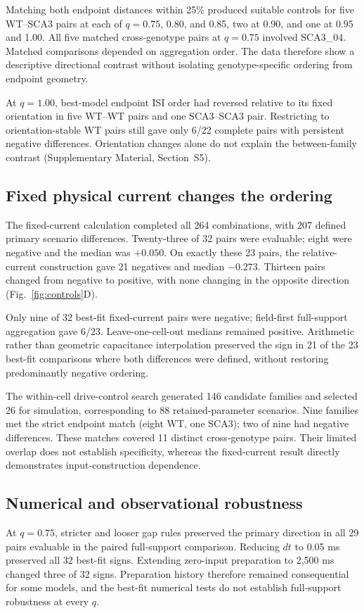 \documentclass[utf8]{FrontiersinHarvard}
\newcommand{\sref}[1]{Supplementary Material, Section~#1}
\begin{document}
Matching both endpoint distances within 25\% produced suitable controls for five WT--SCA3 pairs at each of $q=0.75$, 0.80, and 0.85, two at 0.90, and one at 0.95 and 1.00. All five matched cross-genotype pairs at $q=0.75$ involved SCA3\_04. Matched comparisons depended on aggregation order. The data therefore show a descriptive directional contrast without isolating genotype-specific ordering from endpoint geometry.

At $q=1.00$, best-model endpoint ISI order had reversed relative to its fixed orientation in five WT--WT pairs and one SCA3--SCA3 pair. Restricting to orientation-stable WT pairs still gave only 6/22 complete pairs with persistent negative differences. Orientation changes alone do not explain the between-family contrast (\sref{S5}).



\subsection{Fixed physical current changes the ordering}\label{sec:fixedresults}
The fixed-current calculation completed all 264 combinations, with 207 defined primary scenario differences. Twenty-three of 32 pairs were evaluable; eight were negative and the median was $+0.050$. On exactly these 23 pairs, the relative-current construction gave 21 negatives and median $-0.273$. Thirteen pairs changed from negative to positive, with none changing in the opposite direction (Fig.~\ref{fig:controls}D).

Only nine of 32 best-fit fixed-current pairs were negative; field-first full-support aggregation gave 6/23. Leave-one-cell-out medians remained positive. Arithmetic rather than geometric capacitance interpolation preserved the sign in 21 of the 23 best-fit comparisons where both differences were defined, without restoring predominantly negative ordering.

The within-cell drive-control search generated 146 candidate families and selected 26 for simulation, corresponding to 88 retained-parameter scenarios. Nine families met the strict endpoint match (eight WT, one SCA3); two of nine had negative differences. These matches covered 11 distinct cross-genotype pairs. Their limited overlap does not establish specificity, whereas the fixed-current result directly demonstrates input-construction dependence.

\subsection{Numerical and observational robustness}\label{sec:robustness}
At $q=0.75$, stricter and looser gap rules preserved the primary direction in all 29 pairs evaluable in the paired full-support comparison. Reducing $dt$ to 0.05 ms preserved all 32 best-fit signs. Extending zero-input preparation to 2,500 ms changed three of 32 signs. Preparation history therefore remained consequential for some models, and the best-fit numerical tests do not establish full-support robustness at every $q$.
\end{document}
